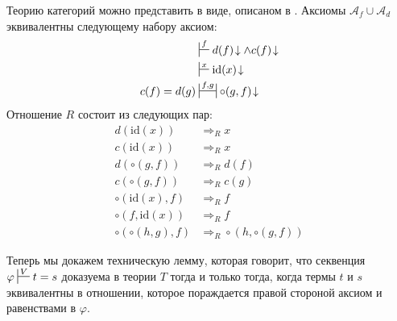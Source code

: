 \documentclass[reqno]{amsart}
\theoremstyle{definition}
\theoremstyle{remark}
\newcommand{\fs}[1]{\mathrm{#1}}
\begin{document}
\begin{example}
Теорию категорий можно представить в виде, описаном в .
Аксиомы $\mathcal{A}_f \cup \mathcal{A}_d$ эквивалентны следующему набору аксиом:
\begin{align*}
& \sststile{}{f} d(f)\!\downarrow \land c(f)\!\downarrow \\
& \sststile{}{x} \fs{id}(x)\!\downarrow \\
c(f) = d(g) & \ssststile{}{f,g} \circ(g,f)\!\downarrow
\end{align*}
Отношение $R$ состоит из следующих пар:
\begin{align*}
d(\fs{id}(x)) & \Rightarrow_R x \\
c(\fs{id}(x)) & \Rightarrow_R x \\
d(\circ(g,f)) & \Rightarrow_R d(f) \\
c(\circ(g,f)) & \Rightarrow_R c(g) \\
\circ(\fs{id}(x),f) & \Rightarrow_R f \\
\circ(f,\fs{id}(x)) & \Rightarrow_R f \\
\circ(\circ(h,g),f) & \Rightarrow_R \circ(h,\circ(g,f))
\end{align*}
\end{example}

Теперь мы докажем техническую лемму, которая говорит, что секвенция $\varphi \sststile{}{V} t = s$ доказуема в теории $T$ тогда и только тогда,
когда термы $t$ и $s$ эквивалентны в отношении, которое пораждается правой стороной аксиом и равенствами в $\varphi$.
\end{document}
